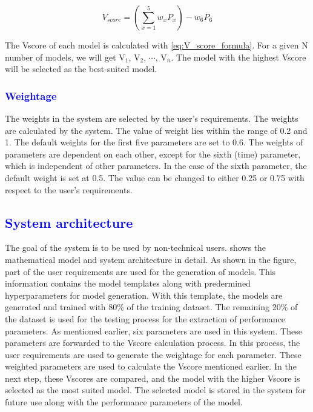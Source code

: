 \documentclass[a4paper,fleqn]{cas-dc}
\newcommand{\responsemod}{\color{blue}}
\newcommand{\responsemodsm}[1]{\textcolor{blue}{#1}}
\newcommand{\subsectionb}[1]{\subsection{\responsemodsm{#1}}}
\newcommand{\subsubsectionb}[1]{\subsubsection{\responsemodsm{#1}}}
\begin{document}
\begin{equation}\label{eq:V_score_formula}
    V_{score} = \left(\sum_{x=1}^5 w_xP_x\right) - w_6P_6
\end{equation}

The Vscore of each model is calculated with \cref{eq:V_score_formula}. For a given N number of models, we will get V$_1$, V$_2$, $\cdots$, V$_n$. The model with the highest Vscore will be selected as the best-suited model.

\subsubsectionb{Weightage}\label{subsubsec:weightage}

The weights in the system are selected by the user's requirements. The weights are calculated by the system. The value of weight lies within the range of 0.2 and 1. The default weights for the first five parameters are set to 0.6. The weights of parameters are dependent on each other, except for the sixth (time) parameter, which is independent of other parameters. In the case of the sixth parameter, the default weight is set at 0.5. The value can be changed to either 0.25 or 0.75 with respect to the user's requirements.

\subsectionb{System architecture}\label{subsec:system_architecture}

{\responsemod
    The goal of the system is to be used by non-technical users.  shows the mathematical model and system architecture in detail. As shown in the figure, part of the user requirements are used for the generation of models. This information contains the model templates along with predermined hyperparameters for model generation. With this template, the models are generated and trained with 80\% of the training dataset. The remaining 20\% of the dataset is used for the testing process for the extraction of performance parameters. As mentioned earlier, six parameters are used in this system. These parameters are forwarded to the Vscore calculation process. In this process, the user requirements are used to generate the weightage for each parameter. These weighted parameters are used to calculate the Vscore mentioned earlier. In the next step, these Vscores are compared, and the model with the higher Vscore is selected as the most suited model. The selected model is stored in the system for future use along with the performance parameters of the model.
}
\end{document}
